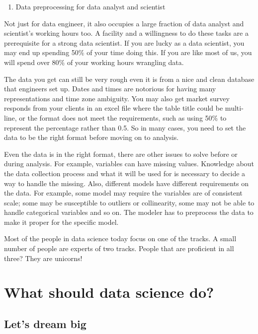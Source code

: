 \documentclass[12pt,]{krantz}
\providecommand{\tightlist}{%
  \setlength{\itemsep}{0pt}\setlength{\parskip}{0pt}}
\theoremstyle{definition}
\theoremstyle{definition}
\theoremstyle{definition}
\theoremstyle{remark}
\begin{document}
\begin{enumerate}
\def\labelenumi{(\arabic{enumi})}
\setcounter{enumi}{1}
\tightlist
\item
  Data preprocessing for data analyst and scientist
\end{enumerate}

Not just for data engineer, it also occupies a large fraction of data
analyst and scientist's working hours too. A facility and a willingness
to do these tasks are a prerequisite for a strong data scientist. If you
are lucky as a data scientist, you may end up spending 50\% of your time
doing this. If you are like most of us, you will spend over 80\% of your
working hours wrangling data.

The data you get can still be very rough even it is from a nice and
clean database that engineers set up. Dates and times are notorious for
having many representations and time zone ambiguity. You may also get
market survey responds from your clients in an excel file where the
table title could be multi-line, or the format does not meet the
requirements, such as using 50\% to represent the percentage rather than
0.5. So in many cases, you need to set the data to be the right format
before moving on to analysis.

Even the data is in the right format, there are other issues to solve
before or during analysis. For example, variables can have missing
values. Knowledge about the data collection process and what it will be
used for is necessary to decide a way to handle the missing. Also,
different models have different requirements on the data. For example,
some model may require the variables are of consistent scale; some may
be susceptible to outliers or collinearity, some may not be able to
handle categorical variables and so on. The modeler has to preprocess
the data to make it proper for the specific model.

Most of the people in data science today focus on one of the tracks. A
small number of people are experts of two tracks. People that are
proficient in all three? They are unicorns!

\section{What should data science
do?}\label{what-should-data-science-do}

\subsection{Let's dream big}\label{lets-dream-big}
\end{document}
